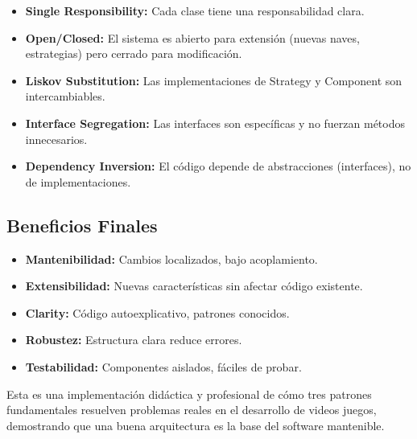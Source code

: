 \documentclass[12pt]{article}
\begin{document}
\begin{itemize}
    \item \textbf{Single Responsibility:} Cada clase tiene una responsabilidad clara.
    \item \textbf{Open/Closed:} El sistema es abierto para extensión (nuevas naves, estrategias) pero cerrado para modificación.
    \item \textbf{Liskov Substitution:} Las implementaciones de Strategy y Component son intercambiables.
    \item \textbf{Interface Segregation:} Las interfaces son específicas y no fuerzan métodos innecesarios.
    \item \textbf{Dependency Inversion:} El código depende de abstracciones (interfaces), no de implementaciones.
\end{itemize}

\subsection{Beneficios Finales}

\begin{itemize}
    \item \textbf{Mantenibilidad:} Cambios localizados, bajo acoplamiento.
    \item \textbf{Extensibilidad:} Nuevas características sin afectar código existente.
    \item \textbf{Clarity:} Código autoexplicativo, patrones conocidos.
    \item \textbf{Robustez:} Estructura clara reduce errores.
    \item \textbf{Testabilidad:} Componentes aislados, fáciles de probar.
\end{itemize}

Esta es una implementación didáctica y profesional de cómo tres patrones fundamentales resuelven problemas reales en el desarrollo de videos juegos, demostrando que una buena arquitectura es la base del software mantenible.
\end{document}
